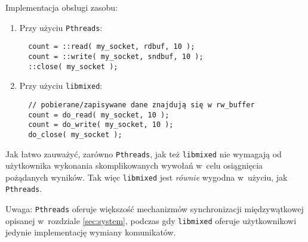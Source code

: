 \documentclass[12pt]{mwart}
\newcommand{\code}{\texttt}
\begin{document}
  Implementacja obsługi zasobu:
  \begin{enumerate}
    \item Przy użyciu \code{Pthreads}:
\begin{verbatim}
  count = ::read( my_socket, rdbuf, 10 );
  count = ::write( my_socket, sndbuf, 10 );
  ::close( my_socket );
\end{verbatim}
    \item Przy użyciu \code{libmixed}:
\begin{verbatim}
  // pobierane/zapisywane dane znajdują się w rw_buffer
  count = do_read( my_socket, 10 ); 
  count = do_write( my_socket, 10 );
  do_close( my_socket );
\end{verbatim}
  \end{enumerate}
\par
\indent
  Jak łatwo zauważyć, zarówno \code{Pthreads}, jak też \code{libmixed} nie wymagają od użytkownika wykonania skomplikowanych
  wywołań w~celu osiągnięcia pożądanych wyników. Tak więc \code{libmixed} jest \emph{równie} wygodna w~użyciu, jak \code{Pthreads}.
\par
\indent
  Uwaga: \code{Pthreads} oferuje większość mechanizmów synchronizacji międzywątkowej opisanej w~rozdziale \ref{sec:system}, podczas gdy \code{libmixed}
  oferuje użytkownikowi jedynie implementację wymiany komunikatów.
\par
\end{document}
